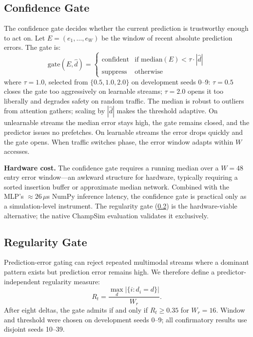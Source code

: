 \documentclass[conference]{IEEEtran}
\begin{document}
\subsection{Confidence Gate}
\label{sec:confidence_gate}

The confidence gate decides whether the current prediction is trustworthy
enough to act on. Let $E = (e_1, \ldots, e_W)$ be the window of recent
absolute prediction errors. The gate is:
\begin{equation}
\text{gate}(E, \hat{d}) = \begin{cases}
\text{confident} & \text{if } \text{median}(E) < \tau \cdot |\hat{d}| \\
\text{suppress}  & \text{otherwise}
\end{cases}
\label{eq:gate}
\end{equation}
where $\tau = 1.0$, selected from $\{0.5, 1.0, 2.0\}$ on development seeds
0--9: $\tau = 0.5$ closes the gate too aggressively on learnable streams;
$\tau = 2.0$ opens it too liberally and degrades safety on random traffic.
The median is robust to outliers from attention gathers; scaling by
$|\hat{d}|$ makes the threshold adaptive. On unlearnable streams the median
error stays high, the gate remains closed, and the predictor issues no
prefetches. On learnable streams the error drops quickly and the gate opens.
When traffic switches phase, the error window adapts within $W$ accesses.

\textbf{Hardware cost.} The confidence gate requires a running median over a
$W\!=\!48$ entry error window---an awkward structure for hardware, typically
requiring a sorted insertion buffer or approximate median network. Combined
with the MLP's ${\approx}26\,\mu$s NumPy inference latency, the confidence
gate is practical only as a simulation-level instrument. The regularity gate
(\cref{sec:regularity_gate}) is the hardware-viable alternative; the native
ChampSim evaluation validates it exclusively.

\subsection{Regularity Gate}
\label{sec:regularity_gate}

Prediction-error gating can reject repeated multimodal streams where a
dominant pattern exists but prediction error remains high. We therefore
define a predictor-independent regularity measure:
\begin{equation}
R_t = \frac{\max_d |\{i : d_i = d\}|}{W_r}.
\label{eq:regularity}
\end{equation}
After eight deltas, the gate admits if and only if $R_t \geq 0.35$ for
$W_r = 16$. Window and threshold were chosen on development seeds 0--9; all
confirmatory results use disjoint seeds 10--39.
\end{document}
